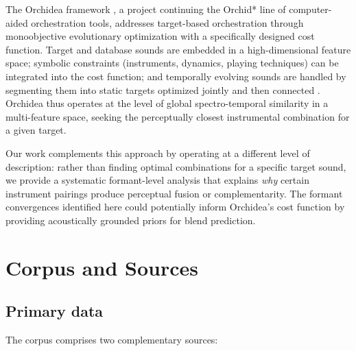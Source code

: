 \documentclass[12pt,a4paper]{article}
\begin{document}
The Orchidea framework \citep{Cella2020,Cella2021}, a project continuing the Orchid* line of
computer-aided orchestration tools, addresses target-based orchestration through monoobjective evolutionary optimization with a specifically
designed cost function. Target and database sounds are embedded in a
high-dimensional feature space; symbolic constraints (instruments, dynamics,
playing techniques) can be integrated into the cost function; and temporally
evolving sounds are handled by segmenting them into static targets optimized
jointly and then connected \citep{Cella2021}. Orchidea thus operates at the
level of global spectro-temporal similarity in a multi-feature space, seeking
the perceptually closest instrumental combination for a given target.

Our work complements this approach by operating at a different level of
description: rather than finding optimal combinations for a specific target
sound, we provide a systematic formant-level analysis that explains
\emph{why} certain instrument pairings produce perceptual fusion or
complementarity. The formant convergences identified here could potentially
inform Orchidea's cost function by providing acoustically grounded priors for
blend prediction.

\section{Corpus and Sources}
\label{sec:corpus}

\subsection{Primary data}

The corpus comprises two complementary sources:
\end{document}

